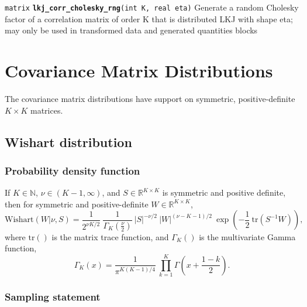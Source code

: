 \documentclass[
  10pt,
]{book}
\begin{document}

\texttt{matrix} \textbf{\texttt{lkj\_corr\_cholesky\_rng}}\texttt{(int\ K,\ real\ eta)}\newline
Generate a random Cholesky factor of a correlation matrix of order K
that is distributed LKJ with shape eta; may only be used in transformed data
and generated quantities blocks

\hypertarget{covariance-matrix-distributions}{%
\chapter{Covariance Matrix Distributions}\label{covariance-matrix-distributions}}

The covariance matrix distributions have support on symmetric,
positive-definite \(K \times K\) matrices.

\hypertarget{wishart-distribution}{%
\section{Wishart distribution}\label{wishart-distribution}}

\hypertarget{probability-density-function-34}{%
\subsection{Probability density function}\label{probability-density-function-34}}

If \(K \in \mathbb{N}\), \(\nu \in (K-1,\infty)\), and \(S \in \mathbb{R}^{K \times K}\) is symmetric and positive definite, then for
symmetric and positive-definite \(W \in \mathbb{R}^{K \times K}\), \[
\text{Wishart}(W|\nu,S) = \frac{1}{2^{\nu K / 2}} \ \frac{1}{\Gamma_K
\! \left( \frac{\nu}{2} \right)} \ \left| S \right|^{-\nu/2} \ \left|
W \right|^{(\nu - K - 1)/2} \ \exp \! \left(- \frac{1}{2} \
\text{tr}\left( S^{-1} W \right) \right) \! , \] where \(\text{tr}()\)
is the matrix trace function, and \(\Gamma_K()\) is the multivariate
Gamma function, \[ \Gamma_K(x) = \frac{1}{\pi^{K(K-1)/4}} \
\prod_{k=1}^K \Gamma \left( x + \frac{1 - k}{2} \right) \!. \]

\hypertarget{sampling-statement-59}{%
\subsection{Sampling statement}\label{sampling-statement-59}}
\end{document}
